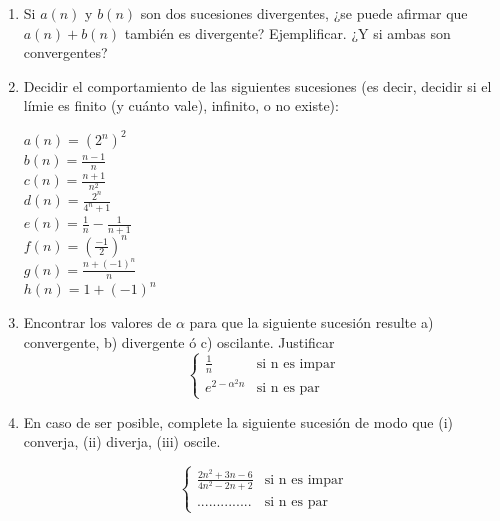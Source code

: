 \documentclass[12pt]{article}
\theoremstyle{definition}
\begin{document}
\begin{enumerate}
\item Si $a(n)$ y $b(n)$ son dos sucesiones divergentes, ¿se puede afirmar que $a(n) + b(n)$ también es divergente? Ejemplificar. ¿Y si ambas son convergentes?
\vspace{0.5 cm}
\item Decidir el comportamiento de las siguientes sucesiones (es decir, decidir si el límie es finito (y cuánto vale), infinito, o no existe):\\
\begin{multicols}{4}
$a(n) = (2^n)^2$\\\vspace{0.5 cm}
$b(n) = \frac{n-1}{n}$\\\vspace{0.3 cm}
$c(n) = \frac{n+1}{n^2}$\\ \vspace{0.3 cm}
$d(n) = \frac {2^n}{4^n+1}$\\ \vspace{0.3 cm}
$e(n) = \frac{1}{n} - \frac{1}{n+1}$ \\ \vspace{0.3 cm}
$f(n) = (\frac{-1}{2})^n$\\ \vspace{0.3 cm}
$g(n) = \frac{n+(-1)^n}{n}$\\ \vspace{0.3 cm}
$h(n) = 1 + (-1)^n$\\
\end{multicols}

\item
\noindent
Encontrar los valores de $\alpha$ para que la siguiente sucesión resulte a) convergente, b) divergente ó c) oscilante. Justificar
\begin{equation*}
\begin{cases} 
 \frac{1}{n}  & \text{si  n es impar} \\
 e^{2-\alpha^2 n} & \text{si  n es par}
\end{cases}
\end{equation*}


\item En caso de ser posible, complete la siguiente sucesión de modo que (i) converja, (ii) diverja, (iii) oscile. 

\begin{equation*}
\begin{cases} 
 \frac{2n^2+3n-6}{4n^2-2n+2}  & \text{si  n es impar} \\
..............& \text{si  n es par}
\end{cases}
\end{equation*}




\end{enumerate}
\end{document}
